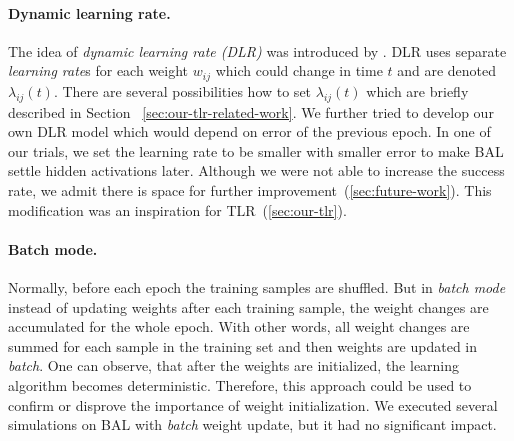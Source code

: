 \paragraph{Dynamic learning rate.} 
\label{sec:our-dynamic-lambda} 
The idea of \emph{dynamic learning rate (DLR)} was introduced by \citet{jacobs1988increased}. DLR uses separate \emph{learning rate}s for each weight $w_{ij}$ which could change in time $t$ and are denoted $\lambda_{ij}(t)$. There are several possibilities how to set $\lambda_{ij}(t)$ which are briefly described in Section ~\ref{sec:our-tlr-related-work}. We further tried to develop our own DLR model which would depend on error of the previous epoch. In one of our trials, we set the learning rate to be smaller with smaller error to make BAL settle hidden activations later. Although we were not able to increase the success rate, we admit there is space for further improvement~(\ref{sec:future-work}). This modification was an inspiration for TLR~(\ref{sec:our-tlr}). 

\paragraph{Batch mode.} 
\label{sec:our-batch-mode}
Normally, before each epoch the training samples are shuffled. But in \emph{batch mode} instead of updating weights after each training sample, the weight changes are accumulated for the whole epoch. With other words, all weight changes are summed for each sample in the training set and then weights are updated in \emph{batch}. One can observe, that after the weights are initialized, the learning algorithm becomes deterministic. Therefore, this approach could be used to confirm or disprove the importance of weight initialization. We executed several simulations on BAL with \emph{batch} weight update, but it had no significant impact. 


